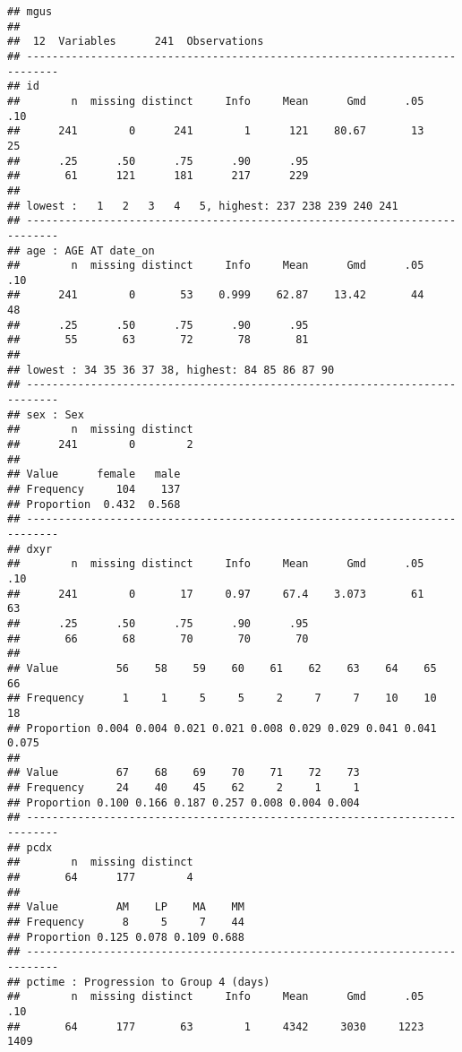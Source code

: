 \documentclass[]{book}
\theoremstyle{definition}
\theoremstyle{definition}
\theoremstyle{definition}
\theoremstyle{remark}
\begin{document}
\begin{verbatim}
## mgus 
## 
##  12  Variables      241  Observations
## ---------------------------------------------------------------------------
## id 
##        n  missing distinct     Info     Mean      Gmd      .05      .10 
##      241        0      241        1      121    80.67       13       25 
##      .25      .50      .75      .90      .95 
##       61      121      181      217      229 
## 
## lowest :   1   2   3   4   5, highest: 237 238 239 240 241
## ---------------------------------------------------------------------------
## age : AGE AT date_on 
##        n  missing distinct     Info     Mean      Gmd      .05      .10 
##      241        0       53    0.999    62.87    13.42       44       48 
##      .25      .50      .75      .90      .95 
##       55       63       72       78       81 
## 
## lowest : 34 35 36 37 38, highest: 84 85 86 87 90
## ---------------------------------------------------------------------------
## sex : Sex 
##        n  missing distinct 
##      241        0        2 
##                         
## Value      female   male
## Frequency     104    137
## Proportion  0.432  0.568
## ---------------------------------------------------------------------------
## dxyr 
##        n  missing distinct     Info     Mean      Gmd      .05      .10 
##      241        0       17     0.97     67.4    3.073       61       63 
##      .25      .50      .75      .90      .95 
##       66       68       70       70       70 
##                                                                       
## Value         56    58    59    60    61    62    63    64    65    66
## Frequency      1     1     5     5     2     7     7    10    10    18
## Proportion 0.004 0.004 0.021 0.021 0.008 0.029 0.029 0.041 0.041 0.075
##                                                     
## Value         67    68    69    70    71    72    73
## Frequency     24    40    45    62     2     1     1
## Proportion 0.100 0.166 0.187 0.257 0.008 0.004 0.004
## ---------------------------------------------------------------------------
## pcdx 
##        n  missing distinct 
##       64      177        4 
##                                   
## Value         AM    LP    MA    MM
## Frequency      8     5     7    44
## Proportion 0.125 0.078 0.109 0.688
## ---------------------------------------------------------------------------
## pctime : Progression to Group 4 (days) 
##        n  missing distinct     Info     Mean      Gmd      .05      .10 
##       64      177       63        1     4342     3030     1223     1409 

\end{verbatim}
\end{document}
